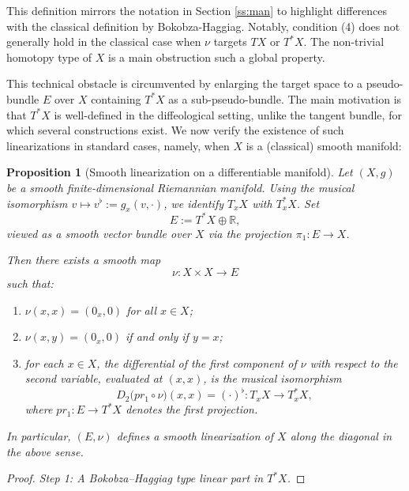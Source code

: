 \documentclass{amsart}
\newcounter{thm}
\newcounter{ex}
\newcounter{re}
\newtheorem{Proposition}[thm]{Proposition}
\begin{document}
This definition mirrors the notation in Section \ref{ss:man} to highlight differences with the classical definition by Bokobza-Haggiag. Notably, condition (4) does not generally hold in the classical case when $\nu$ targets $TX$ or $T^*X$. The non-trivial homotopy type of $X$ is a main obstruction such a global property.

This technical obstacle is circumvented by enlarging the target space to a pseudo-bundle $E$ over $X$ containing $T^*X$ as a sub-pseudo-bundle. The main motivation is that $T^*X$ is well-defined in the diffeological setting, unlike the tangent bundle, for which several constructions exist. We now verify the existence of such linearizations in standard cases, {\color{black}namely, when $X$ is a (classical) smooth manifold}:

{\color{black}

\begin{Proposition}[Smooth linearization on a differentiable manifold]
\label{prop:linearization-smooth}
Let $(X,g)$ be a smooth finite-dimensional Riemannian manifold.
Using the musical isomorphism $v \mapsto v^\flat := g_x(v,\cdot)$,
we identify $T_xX$ with $T_x^\ast X$.
Set
\[
E := T^\ast X \oplus \mathbb{R},
\]
viewed as a smooth vector bundle over $X$ via the projection 
$\pi_1 : E \to X$.

Then there exists a smooth map
\[
\nu : X\times X \longrightarrow E
\]
such that:
\begin{enumerate}
  \item[(i)] $\nu(x,x) = (0_x,0)$ for all $x\in X$;

  \item[(ii)] $\nu(x,y) = (0_x,0)$ if and only if $y=x$;

  \item[(iii)] for each $x\in X$, the differential of the first component
  of $\nu$ with respect to the second variable, evaluated at $(x,x)$, is
  the musical isomorphism
  \[
    D_2\bigl(pr_1\circ\nu\bigr)(x,x)
    = (\cdot)^\flat : T_xX \longrightarrow T_x^\ast X ,
  \]
  where $pr_1 : E\to T^\ast X$ denotes the first projection.
\end{enumerate}
In particular, $(E,\nu)$ defines a smooth linearization of $X$ along the
diagonal in the above sense.
\end{Proposition}

\begin{proof}
\emph{Step 1: A Bokobza--Haggiag type linear part in $T^\ast X$.}


\end{proof}}
\end{document}
